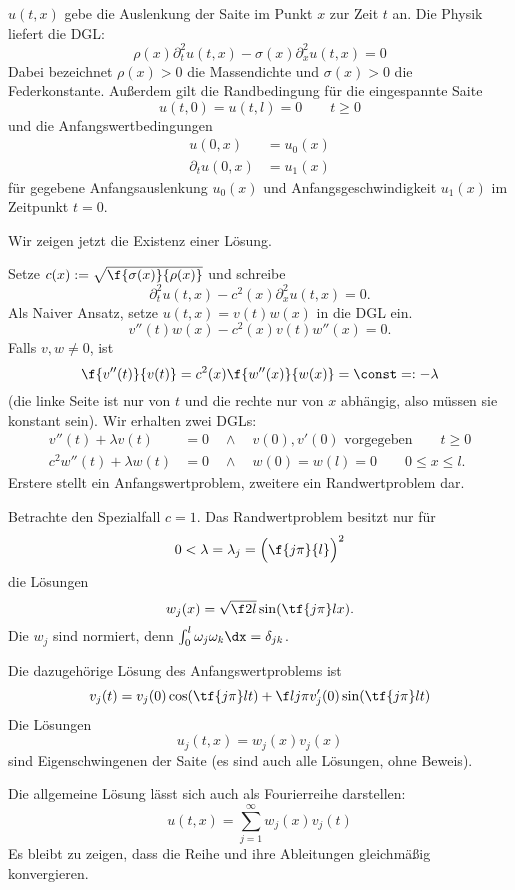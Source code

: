 \setcounter{thm}{4} %
\begin{ex} %
	$u(t,x)$ gebe die Auslenkung der Saite im Punkt $x$ zur Zeit $t$ an. 
	Die Physik liefert die DGL:
	\[
		\rho(x) \partial_t^2 u(t,x) - \sigma(x) \partial_x^2 u(t,x) = 0
	\]
	Dabei bezeichnet $\rho(x) > 0$ die Massendichte und $\sigma(x) > 0$ die Federkonstante.
	Außerdem gilt die Randbedingung für die eingespannte Saite
	\[
		u(t,0) = u(t,l) = 0
		\qquad t \ge 0
	\]
	und die Anfangswertbedingungen
	\begin{align*}
		u(0,x) &= u_0(x) \\
		\partial_t u(0,x) &= u_1(x)
	\end{align*}
	für gegebene Anfangsauslenkung $u_0(x)$ und Anfangsgeschwindigkeit $u_1(x)$ im Zeitpunkt $t = 0$.

	Wir zeigen jetzt die Existenz einer Lösung.

	Setze $c(x) := \sqrt{\f {\sigma(x)}{\rho(x)}}$ und schreibe
	\[
		\partial_t^2 u(t,x) - c^2(x) \partial_x^2 u(t,x) = 0.
	\]
	Als Naiver Ansatz, setze $u(t,x) = v(t)w(x)$ in die DGL ein.
	\[
		v''(t) w(x) - c^2(x) v(t) w''(x) = 0.
	\]
	Falls $v,w \neq 0$, ist
	\[
		\f {v''(t)}{v(t)} = c^2(x) \f {w''(x)}{w(x)} = \const =: - \lambda
	\]
	(die linke Seite ist nur von $t$ und die rechte nur von $x$ abhängig, also müssen sie konstant sein).
	Wir erhalten zwei DGLs:
	\begin{align*}
		v''(t) + \lambda v(t) &= 0 \quad \land  \quad v(0), v'(0) \text{ vorgegeben} \qquad t \ge 0 \\
		c^2 w''(t) + \lambda w(t) &= 0 \quad \land \quad w(0) = w(l) = 0 \qquad 0 \le x \le l.
	\end{align*}
	Erstere stellt ein Anfangswertproblem, zweitere ein Randwertproblem dar.

	Betrachte den Spezialfall $c = 1$.
	Das Randwertproblem besitzt nur für 
	\[
		0 < \lambda = \lambda_j = \Big( \f {j\pi}{l} \Big)^2
	\]
	die Lösungen
	\[
		w_j(x) = \sqrt{\f 2l} \sin( \tf {j\pi}l x).
	\]
	Die $w_j$ sind normiert, denn $\int_{0}^l \omega_j \omega_k \dx = \delta_{jk}$.

	Die dazugehörige Lösung des Anfangswertproblems ist
	\[
		v_j(t) = v_j(0) \cos(\tf {j\pi}l t) + \f l{j\pi} v_j'(0) \sin(\tf{j\pi}l t)
	\]
	Die Lösungen
	\[
		u_j(t,x) = w_j(x) v_j(x)
	\]
	sind Eigenschwingenen der Saite (es sind auch alle Lösungen, ohne Beweis).
	
	Die allgemeine Lösung lässt sich auch als Fourierreihe darstellen:
	\[
		u(t,x) = \sum_{j=1}^\infty w_j(x) v_j(t)
	\]
	Es bleibt zu zeigen, dass die Reihe und ihre Ableitungen gleichmäßig konvergieren.
\end{ex}


